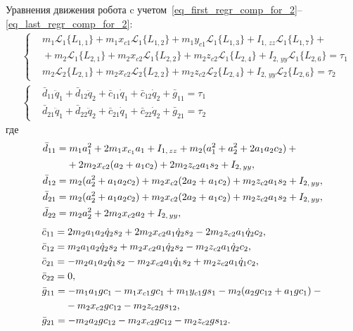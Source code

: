 Уравнения движения робота c учетом~\eqref{eq_first_regr_comp_for_2}--\eqref{eq_last_regr_comp_for_2}:
\begin{align}
    & \left\{
    \begin{aligned}
        \!\!& m_1 \mathcal{L}_1 \{ L_{1,1} \} + m_1 x_{c1} \mathcal{L}_1 \{ L_{1,2} \} + m_1 y_{c1}  \mathcal{L}_1 \{ L_{1,3} \} + I_{1,\,zz} \mathcal{L}_1 \{ L_{1,7} \} + {} \\
        \!\!&{} + m_2 \mathcal{L}_1 \{ L_{2,1} \} + m_2 x_{c2} \mathcal{L}_1 \{ L_{2,2} \} + m_2 z_{c2}  \mathcal{L}_1 \{ L_{2,4} \} + I_{2,\,yy} \mathcal{L}_1 \{ L_{2,6} \} = \tau_1
        \\
        \!\!& m_2 \mathcal{L}_2 \{ L_{2,1} \} + m_2 x_{c2} \mathcal{L}_2 \{ L_{2,2} \} + m_2 z_{c2}  \mathcal{L}_2 \{ L_{2,4} \} + I_{2,\,yy} \mathcal{L}_2 \{ L_{2,6} \} = \tau_2
    \end{aligned}
    \right.
    \\[0.5cm]
    & \left\{
    \begin{aligned}
        \!\!& \bar{d}_{11} \ddot{q}_1 + \bar{d}_{12} \ddot{q}_2 + \bar{c}_{11} \dot{q}_1 + \bar{c}_{12} \dot{q}_2 + \bar{g}_{11} = \tau_1
        \\
        \!\!& \bar{d}_{21} \ddot{q}_1 + \bar{d}_{22} \ddot{q}_2 + \bar{c}_{21} \dot{q}_1 + \bar{c}_{22} \dot{q}_2 + \bar{g}_{21} = \tau_2
        \end{aligned}
    \right.
\end{align}
где
\begin{align}
    & \bar{d}_{11} = m_1 a_1^2 + 2 m_1 x_{c_1} a_1 + I_{1,\,zz} + m_2(a_1^2 + a_2^2 + 2 a_1 a_2 c_2) + {} \notag
    \\
    & \phantom{\bar{d}_{11} = } + 2 m_2 x_{c2} (a_2 + a_1 c_2) + 2 m_2 z_{c2} a_1 s_2 + I_{2,\,yy},
    \\
    & \bar{d}_{12} = m_2 (a_2^2 + a_1 a_2 c_2 ) + m_2 x_{c2} (2 a_2 + a_1 c_2) + m_2 z_{c2} a_1 s_2 + I_{2,\,yy},
    \\
    & \bar{d}_{21} = m_2(a_2^2 + a_1 a_2 c_2) + m_2 x_{c2} (2 a_2 + a_1 c_2) + m_2 z_{c2} a_1 s_2 + I_{2,\,yy},
    \\
    & \bar{d}_{22} = m_2 a_2^2 + 2 m_2 x_{c2} a_2 + I_{2,\,yy},
\end{align}
\begin{align}
    & \bar{c}_{11} = 2 m_2 a_1 a_2 \dot{q}_2 s_2 + 2 m_2 x_{c2} a_1 \dot{q}_2 s_2 - 2 m_2 z_{c2} a_1 \dot{q}_2 c_2,
    \\
    & \bar{c}_{12} = m_2 a_1 a_2 \dot{q}_2 s_2 + m_2 x_{c2} a_1 \dot{q}_2 s_2 - m_2 z_{c2} a_1 \dot{q}_2 c_2,
    \\
    & \bar{c}_{21} = -m_2 a_1 a_2 \dot{q}_1 s_2 - m_2 x_{c2} a_1 \dot{q}_1 s_2 + m_2 z_{c2} a_1 \dot{q}_1 c_2,
    \\
    & \bar{c}_{22} = 0,
    \\
    & \bar{g}_{11} = -m_1 a_1 g c_1 - m_1 x_{c1} g c_1 + m_1 y_{c1} g s_1 - m_2 (a_2 g c_{12} + a_1 g c_1) - {} \notag
    \\
    & \phantom{\bar{g}_{11} = } - m_2 x_{c2} g c_{12} - m_2 z_{c2} g s_{12},
    \\
    & \bar{g}_{21} = -m_2 a_2 g c_{12} - m_2 x_{c2} g c_{12}  - m_2 z_{c2} g s_{12} \ldotp
\end{align}

